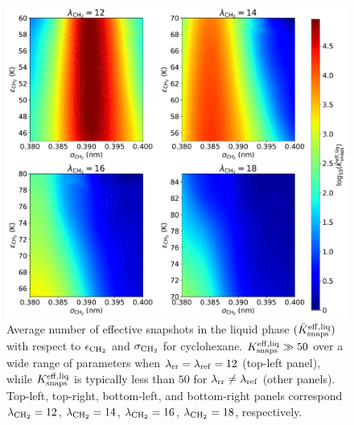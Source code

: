 \documentclass[journal=jced,manuscript=article]{achemso}
\begin{document}
	\begin{figure}[htb!]
		\centering
		\includegraphics[width=6.4in]{CYC6_Neff_lam.pdf}
		\caption{Average number of effective snapshots in the liquid phase $(\bar K_{\rm snaps}^{\rm eff, liq})$ with respect to $\epsilon_{\rm CH_2}$ and $\sigma_{\rm CH_2}$ for cyclohexane. $K_{\rm snaps}^{\rm eff, liq} \gg 50$ over a wide range of parameters when $\lambda_{\rm rr} = \lambda_{\rm ref} = 12$ (top-left panel), while $K_{\rm snaps}^{\rm eff, liq}$ is typically less than $50$ for $\lambda_{\rm rr} \neq \lambda_{\rm ref}$ (other panels). Top-left, top-right, bottom-left, and bottom-right panels correspond $\lambda_{\rm CH_2} = 12$, $\lambda_{\rm CH_2} = 14$, $\lambda_{\rm CH_2} = 16$, $\lambda_{\rm CH_2} = 18$, respectively.}
		\label{fig:Neff_CYC6}
	\end{figure}
\end{document}
